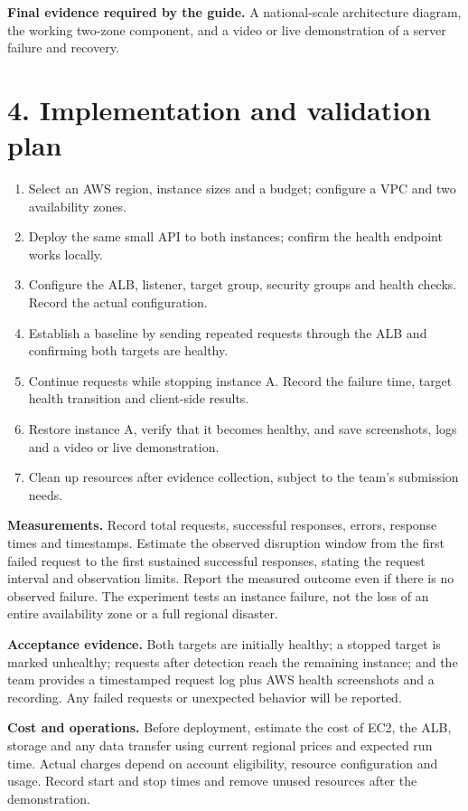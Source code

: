 \documentclass[11pt,a4paper]{article}
\newcommand{\sectionline}[1]{\section*{\color{navy}#1}}
\begin{document}
\textbf{Final evidence required by the guide.} A national-scale architecture diagram, the working two-zone component, and a video or live demonstration of a server failure and recovery.
\sectionline{4. Implementation and validation plan}
\begin{enumerate}
\item Select an AWS region, instance sizes and a budget; configure a VPC and two availability zones.
\item Deploy the same small API to both instances; confirm the health endpoint works locally.
\item Configure the ALB, listener, target group, security groups and health checks. Record the actual configuration.
\item Establish a baseline by sending repeated requests through the ALB and confirming both targets are healthy.
\item Continue requests while stopping instance A. Record the failure time, target health transition and client-side results.
\item Restore instance A, verify that it becomes healthy, and save screenshots, logs and a video or live demonstration.
\item Clean up resources after evidence collection, subject to the team's submission needs.
\end{enumerate}
\textbf{Measurements.} Record total requests, successful responses, errors, response times and timestamps. Estimate the observed disruption window from the first failed request to the first sustained successful responses, stating the request interval and observation limits. Report the measured outcome even if there is no observed failure. The experiment tests an instance failure, not the loss of an entire availability zone or a full regional disaster.

\newpage
\textbf{Acceptance evidence.} Both targets are initially healthy; a stopped target is marked unhealthy; requests after detection reach the remaining instance; and the team provides a timestamped request log plus AWS health screenshots and a recording. Any failed requests or unexpected behavior will be reported.

\textbf{Cost and operations.} Before deployment, estimate the cost of EC2, the ALB, storage and any data transfer using current regional prices and expected run time. Actual charges depend on account eligibility, resource configuration and usage. Record start and stop times and remove unused resources after the demonstration.
\end{document}
